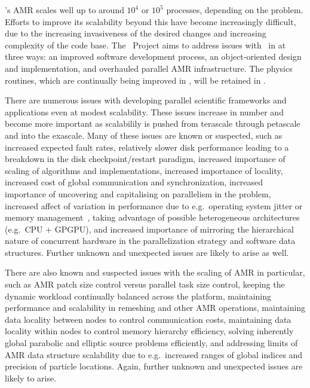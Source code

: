 \documentclass[10pt,twocolumn]{article}
\begin{document}
\enzo's AMR scales well up to around $10^4$ or $10^5$ processes,
depending on the problem.  Efforts to improve its scalability beyond
this have become increasingly difficult, due to the increasing
invasiveness of the desired changes and increasing complexity of the
code base.  The \cello\ Project aims to address issues with \enzo\ in
at three ways: an improved software development process, an
object-oriented design and implementation, and overhauled parallel AMR
infrastructure.  The physics routines, which are continually being
improved in \enzo, will be retained in \enzoii.

There are numerous issues with developing parallel scientific
frameworks and applications even at modest scalability.  These issues
increase in number and become more important as scalabilily is pushed
from terascale through petascale and into the exascale.  Many of these
issues are known or suspected, such as increased expected fault rates,
relatively slower disk performance leading to a breakdown in the disk
checkpoint/restart paradigm, increased importance of scaling of
algorithms and implementations, increased importance of locality,
increased cost of global communication and synchronization, increased
importance of uncovering and capitalising on parallelism in the
problem, increased affect of variation in performance due to
e.g.~operating system jitter or memory management~\cite{StSh09},
taking advantage of possible heterogeneous architectures (e.g.~CPU +
GPGPU), and increased importance of mirroring the hierarchical nature
of concurrent hardware in the parallelization strategy and software
data structures.  Further unknown and unexpected issues are likely to
arise as well.

There are also known and suspected issues with the scaling of AMR in
particular, such as AMR patch size control versus parallel task size
control, keeping the dynamic workload continually balanced across the
platform, maintaining performance and scalability in remeshing and
other AMR operations, maintaining data locality between nodes to
control communication costs, maintaining data locality within nodes to
control memory hierarchy efficiency, solving inherently global
parabolic and elliptic source problems efficiently, and addressing
limits of AMR data structure scalability due to e.g.~increased ranges
of global indices and precision of particle locations.  Again, further
unknown and unexpected issues are likely to arise.
\end{document}
